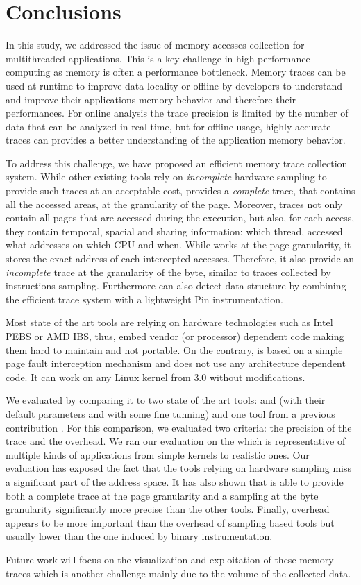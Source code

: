 \section{Conclusions}
\label{sec:cncl}

In this study, we addressed the issue of memory accesses collection for
multithreaded applications. This is a key challenge in high performance
computing as memory is often a performance
bottleneck. Memory traces can be used at runtime to improve data locality or
offline by developers to understand and improve their applications memory
behavior and therefore their performances. For online analysis the trace precision
is limited by the number of data that can be analyzed in real time, but for
offline usage, highly accurate traces can provides a better understanding of
the application memory behavior.

To address this challenge, we have proposed \Moca an efficient memory trace
collection system. While other existing tools
rely on \emph{incomplete} hardware sampling to
provide such traces at an acceptable cost, \Moca provides a \emph{complete}
trace, that contains all the accessed areas, at the granularity of the page.
Moreover, \Moca traces not only
contain all pages that are accessed during the execution, but also, 
for each access, they contain temporal, spacial and sharing
information: which thread, accessed what addresses on which CPU and when.
While \Moca works at the page granularity, it stores the exact
address of each intercepted accesses. Therefore, it also provide an
\emph{incomplete} trace at the granularity of the byte, similar to
traces collected by instructions sampling. Furthermore \Moca can also detect
data structure by combining the efficient trace system with a lightweight Pin
instrumentation.

Most state of the art tools are relying on hardware technologies such as Intel PEBS
or AMD IBS, thus, embed vendor (or processor) dependent code making them hard
to maintain and not portable. On the contrary, \Moca is based on a simple page
fault interception mechanism and does not use any architecture dependent code.
It can work on any Linux kernel from $3.0$ without modifications.

We evaluated \Moca by comparing it to two state of the art tools: \Mitos and
\MemProf (with their default parameters and with some fine tunning) and one
tool from a previous contribution \TABARNAC. For this comparison, we evaluated
two criteria: the precision of the trace and the overhead. We ran our
evaluation on the \NPB which is representative of multiple kinds of applications from simple kernels
to realistic ones. Our evaluation has exposed the fact that the tools
relying on hardware sampling miss a significant part of the address space. It
has also shown that \Moca is able to provide both a complete trace at the page
granularity and a sampling at the byte granularity significantly more precise than the
other tools. Finally, \Moca overhead appears to be more important than the overhead of sampling
based tools but usually lower than the one induced by binary instrumentation.

Future work will focus on the visualization and exploitation of these memory traces
which is another challenge mainly due to the volume of the collected data.
